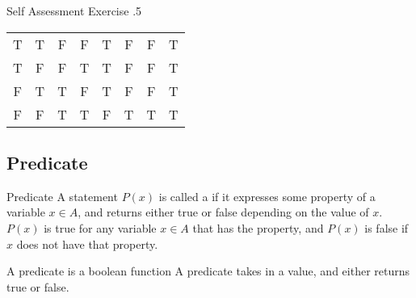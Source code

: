 \documentclass[../notes.tex]{subfiles}
\begin{document}
				\begin{exercise}{Self Assessment Exercise \thechapter.5}
					\begin{center}
						\begin{tabular}{| c c | c c | c | c | c | c|}
							\hline
							\tablehead{$p$} & \tablehead{$q$} & \tablehead{$\lnot p$} & \tablehead{$\lnot q$} & \tablehead{$p \lor q$} & \tablehead{$\lnot (p \lor q)$} & \tablehead{$(\lnot p) \land (\lnot q)$} & \tablehead{$\lnot (p \lor q) \leftrightarrow (\lnot p) \land (\lnot q)$}\\
							\hline
							T & T & F & F & T & F & F & T\\
							T & F & F & T & T & F & F & T\\
							F & T & T & F & T & F & F & T\\
							F & F & T & T & F & T & T & T\\
							\hline
						\end{tabular}
					\end{center}
				\end{exercise}
			\subsection{Predicate}
				\begin{definition}{Predicate}
					A statement $P(x)$ is called a  if it expresses some property of a variable $x \in A$, and returns either true or false depending on the value of $x$. $P(x)$ is true for any variable $x \in A$ that has the property, and $P(x)$ is false if $x$ does not have that property.
				\end{definition}
				\begin{sidenote}[width=0.65\textwidth]{A predicate is a boolean function}
					A predicate takes in a value, and either returns true or false.
				\end{sidenote}
\end{document}
